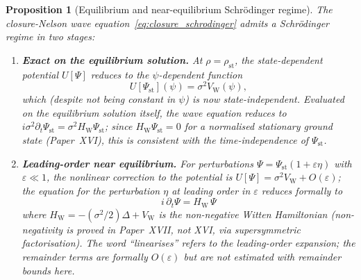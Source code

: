 \documentclass[12pt]{article}
\newtheorem{proposition}[theorem]{Proposition}
\newcommand{\VW}{V_{\mathrm{W}}}
\begin{document}
\begin{proposition}[Equilibrium and near-equilibrium Schr\"odinger regime]\label{prop:linearisation}
The closure-Nelson wave equation~\eqref{eq:closure_schrodinger} admits a Schr\"odinger regime in two stages:
\begin{enumerate}
    \item \textbf{Exact on the equilibrium solution.} At $\rho = \rho_{\mathrm{st}}$, the state-dependent potential $U[\Psi]$ reduces to the $\psi$-dependent function
    \begin{equation}\label{eq:U_stationary}
        U[\Psi_{\mathrm{st}}](\psi) = \sigma^2\VW(\psi),
    \end{equation}
    which (despite not being constant in $\psi$) is now state-independent. Evaluated on the equilibrium solution itself, the wave equation reduces to $i\sigma^2\partial_t\Psi_{\mathrm{st}} = \sigma^2 H_{\mathrm{W}}\Psi_{\mathrm{st}}$; since $H_{\mathrm{W}}\Psi_{\mathrm{st}} = 0$ for a normalised stationary ground state (Paper~XVI), this is consistent with the time-independence of $\Psi_{\mathrm{st}}$.

    \item \textbf{Leading-order near equilibrium.} For perturbations $\Psi = \Psi_{\mathrm{st}}(1 + \varepsilon\eta)$ with $\varepsilon \ll 1$, the nonlinear correction to the potential is $U[\Psi] = \sigma^2\VW + O(\varepsilon)$; the equation for the perturbation $\eta$ at leading order in $\varepsilon$ reduces formally to
    \begin{equation}\label{eq:linearised}
        \boxed{i\,\partial_t\Psi = H_{\mathrm{W}}\,\Psi}
    \end{equation}
    where $H_{\mathrm{W}} = -(\sigma^2/2)\Delta + \VW$ is the non-negative Witten Hamiltonian (non-negativity is proved in Paper~XVII, not XVI, via supersymmetric factorisation). The word ``linearises'' refers to the leading-order expansion; the remainder terms are formally $O(\varepsilon)$ but are not estimated with remainder bounds here.
\end{enumerate}
\end{proposition}
\end{document}
